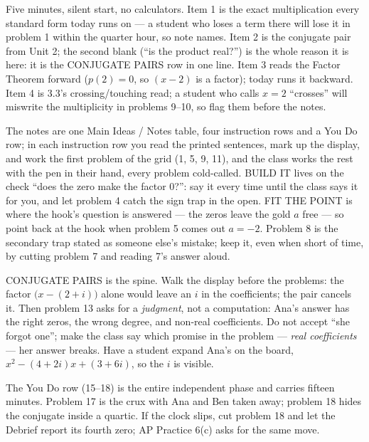 \documentclass[10pt]{article}
\begin{document}
\begin{teachernote}[Warm-Up]
Five minutes, silent start, no calculators. Item 1 is the exact multiplication every standard
form today runs on --- a student who loses a term there will lose it in problem 1 within the
quarter hour, so note names. Item 2 is the conjugate pair from Unit 2; the second blank
(``is the product real?'') is the whole reason it is here: it is the CONJUGATE PAIRS row in
one line. Item 3 reads the Factor Theorem forward ($p(2) = 0$, so $(x - 2)$ is a factor);
today runs it backward. Item 4 is 3.3's crossing/touching read; a student who calls $x = 2$
``crosses'' will miswrite the multiplicity in problems 9--10, so flag them before the notes.
\end{teachernote}

\begin{teachernote}
The notes are one Main Ideas / Notes table, four instruction rows and a You Do row; in each
instruction row you read the printed sentences, mark up the display, and work the first
problem of the grid (1, 5, 9, 11), and the class works the rest with the pen in their hand,
every problem cold-called. BUILD IT lives on the check ``does the zero make the factor 0?'':
say it every time until the class says it for you, and let problem 4 catch the sign trap in
the open. FIT THE POINT is where the hook's question is answered --- the zeros leave the gold
$a$ free --- so point back at the hook when problem 5 comes out $a = -2$. Problem 8 is the
secondary trap stated as someone else's mistake; keep it, even when short of time, by cutting
problem 7 and reading 7's answer aloud.

CONJUGATE PAIRS is the spine. Walk the display before the problems: the factor
$\bigl(x - (2 + i)\bigr)$ alone would leave an $i$ in the coefficients; the pair cancels it.
Then problem 13 asks for a \emph{judgment}, not a computation: Ana's answer has the right
zeros, the wrong degree, and non-real coefficients. Do not accept ``she forgot one''; make the
class say which promise in the problem --- \emph{real coefficients} --- her answer breaks. Have
a student expand Ana's on the board, $x^2 - (4 + 2i)x + (3 + 6i)$, so the $i$ is visible.

The You Do row (15--18) is the entire independent phase and carries fifteen minutes. Problem
17 is the crux with Ana and Ben taken away; problem 18 hides the conjugate inside a quartic.
If the clock slips, cut problem 18 and let the Debrief report its fourth zero; AP Practice
6(c) asks for the same move.
\end{teachernote}
\end{document}
